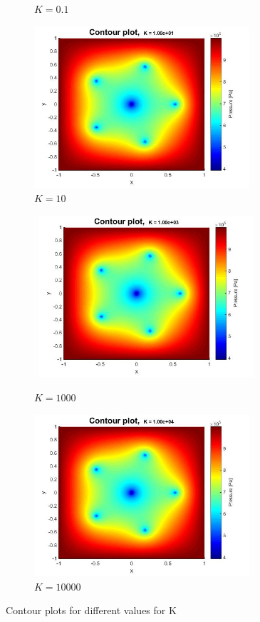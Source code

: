 \documentclass[a4paper]{report}
\begin{document}
\begin{figure}
\begin{subfigure}{.45\textwidth}
	\caption{$K=0.1$}
	\label{fig:sub3}
	\end{subfigure}%
	\begin{subfigure}{.45\textwidth}
	\centering
	\includegraphics[width=8cm]{K10_contour.jpg}
	\caption{$K=10$}
	\label{fig:sub4}
\end{subfigure}
	\begin{subfigure}{.45\textwidth}
	\centering\
	\includegraphics[width=8cm]{K1000_contour.jpg}
	\caption{$K=1000$}
	\label{fig:sub3}
\end{subfigure}%
\begin{subfigure}{.45\textwidth}
	\centering
	\includegraphics[width=8cm]{K10000_contour.jpg}
	\caption{$K=10000$}
	\label{fig:sub4}
\end{subfigure}
	\caption{Contour plots for different values for K}
	\label{fig:test}
\end{figure}
\end{document}
